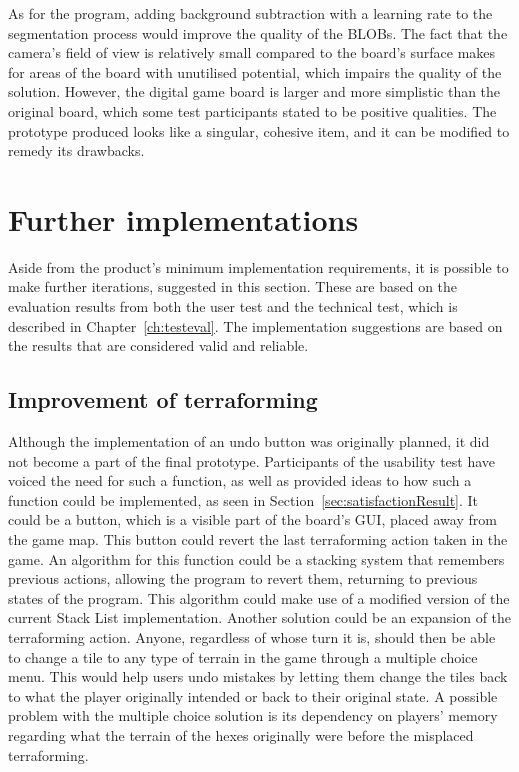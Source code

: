 As for the program, adding background subtraction with a learning rate to the segmentation process would improve the quality of the BLOBs. The fact that the camera’s field of view is relatively small compared to the board’s surface makes for areas of the board with unutilised potential, which impairs the quality of the solution. However, the digital game board is larger and more simplistic than the original board, which some test participants stated to be positive qualities. The prototype produced looks like a singular, cohesive item, and it can be modified to remedy its drawbacks.

\section{Further implementations}
Aside from the product's minimum implementation requirements, it is possible to make further iterations, suggested in this section. These are based on the evaluation results from both the user test and the technical test, which is described in Chapter~\ref{ch:testeval}. The implementation suggestions are based on the results that are considered valid and reliable.

\subsection{Improvement of terraforming}
Although the implementation of an undo button was originally planned, it did not become a part of the final prototype. Participants of the usability test have voiced the need for such a function, as well as provided ideas to how such a function could be implemented, as seen in Section~\ref{sec:satisfactionResult}. It could be a button, which is a visible part of the board's GUI, placed away from the game map. This button could revert the last terraforming action taken in the game. An algorithm for this function could be a stacking system that remembers previous actions, allowing the program to revert them, returning to previous states of the program. This algorithm could make use of a modified version of the current Stack List implementation. Another solution could be an expansion of the terraforming action. Anyone, regardless of whose turn it is, should then be able to change a tile to any type of terrain in the game through a multiple choice menu. This would help users undo mistakes by letting them change the tiles back to what the player originally intended or back to their original state. A possible problem with the multiple choice solution is its dependency on players' memory regarding what the terrain of the hexes originally were before the misplaced terraforming. 

